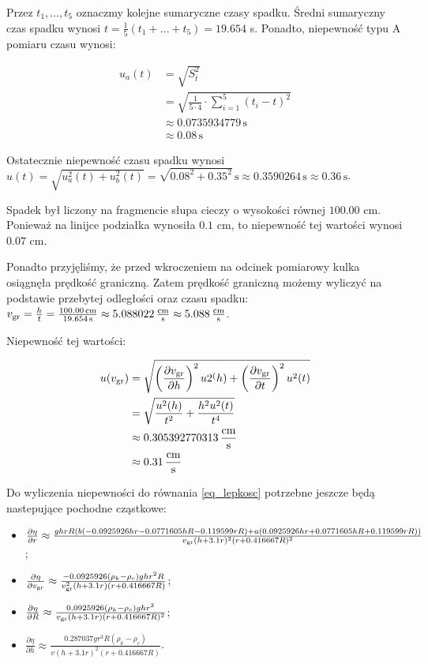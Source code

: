 \documentclass[a4paper]{article}
\begin{document}
Przez $t_1, \dots, t_5$ oznaczmy kolejne sumaryczne czasy spadku.
Średni sumaryczny czas spadku wynosi $t = \frac 1 5 (t_1 + \dots + t_5) = 19.654$ s.
Ponadto, niepewność typu A pomiaru czasu wynosi:

\begin{align*}
	u_a(t) &= \sqrt{S^{2}_{\overline{t}}} \\
	&= \sqrt{\frac{1}{5 \cdot 4} \cdot \sum_{i=1}^{5} (t_i - t)^2} \\
	&\approx 0.0735934779 \, \text{s} \\
	&\approx 0.08 \, \text{s}
\end{align*}

Ostatecznie niepewność czasu spadku wynosi $u(t) = \sqrt{u_a^2(t) + u_b^2(t)} = \sqrt{0.08^2 + 0.35^2} \, \text{s} \approx 0.3590264 \, \text{s} \approx 0.36\, \text{s}$.

Spadek był liczony na fragmencie słupa cieczy o wysokości równej $100.00$ cm.
Ponieważ na linijce podziałka wynosiła $0.1$ cm, to niepewność tej wartości wynosi $0.07$ cm.

Ponadto przyjęliśmy, że przed wkroczeniem na odcinek pomiarowy kulka osiągnęła prędkość graniczną.
Zatem prędkość graniczną możemy wyliczyć na podstawie przebytej odległości oraz czasu spadku:
$v_{\text{gr}} = \frac{h}{t} = \frac{100.00 \, \text{cm}}{19.654 \, \text{s}} \approx 5.088022 \, \frac{\text{cm}}{\text{s}} \approx 5.088 \, \frac{\text{cm}}{\text{s}}$.

Niepewność tej wartości:

\begin{align*}
	u(v_{\text{gr}}) &= \sqrt{\left(\frac{\partial v_{\text{gr}}}{\partial h}\right)^2 u2^(h) + \left(\frac{\partial v_{\text{gr}}}{\partial t}\right)^2 u^2(t)} \\
	&= \sqrt{\frac{u^2(h)}{t^2} + \frac{h^2 u^2(t)}{t^4}} \\
	&\approx 0.305392770313 \, \frac{\text{cm}}{\text{s}} \\
	&\approx 0.31 \, \frac{\text{cm}}{\text{s}}
\end{align*}

Do wyliczenia niepewności do równania \ref{eq_lepkosc} potrzebne jeszcze będą nastepujące pochodne cząstkowe:

\begin{itemize}
	\item $\frac{\partial \eta}{\partial r} \approx \frac{g h r R (b (-0.0925926 h r - 0.0771605 h R - 0.119599 r R) + a (0.0925926 h r + 0.0771605 h R + 0.119599 r R))}{v_{\text{gr}} (h + 3.1r)^2 (r + 0.416667 R)^2}$;
	\item $\frac{\partial \eta}{\partial v_{\text{gr}}} \approx \frac{-0.0925926(\rho_k - \rho_c) g h r^2 R}{v_{\text{gr}}^2 (h + 3.1r)(r + 0.416667R)}$;
	\item $\frac{\partial \eta}{\partial R} \approx \frac{0.0925926(\rho_k - \rho_c) g h r^3}{v_{\text{gr}} (h + 3.1r)(r + 0.416667 R)^2}$;
	\item $\frac{\partial \eta}{\partial h} \approx \frac{0.287037 g r^3 R (\rho_k - \rho_c)}{v(h + 3.1r)^2 (r + 0.416667 R)}$.
\end{itemize}
\end{document}
